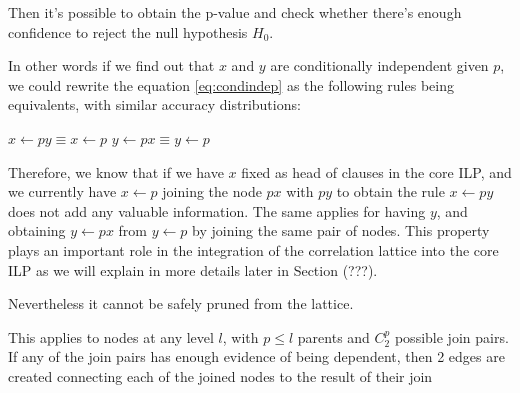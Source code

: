 Then it's possible to obtain the p-value and check whether there's enough confidence to reject the null hypothesis
$H_0$. 


In other words if we find out that $x$ and $y$ are conditionally independent given $p$, we could rewrite the equation
\ref{eq:condindep} as the following rules being equivalents, with similar accuracy distributions:

\begin{center}
  $x \leftarrow py \equiv x \leftarrow p $ \newline 
  $y \leftarrow px \equiv y \leftarrow p $
\end{center}

Therefore, we know that if we have $x$ fixed as head of clauses in the core ILP, and we currently have $x \leftarrow p$
joining the node $px$ with $py$ to obtain the rule $x \leftarrow py$ does not add any valuable information. The same
applies
for having $y$, and obtaining $y \leftarrow px$ from $y \leftarrow p$ by joining the same pair of nodes. This property
plays an important role in the integration of the correlation lattice into the core ILP as we will explain in more
details later in Section (???).

Nevertheless it cannot be safely pruned from the lattice.  

\begin{comment}
In level 1 from \graphname, nodes can be directly pruned, on the other hand, for further levels, for a node to be
pruned by independence, all the possible joins resulting the node must be independent. In level 2, for example, in order
to prune the node $r a_1 b_1 c_1$, given that in level 1 the nodes $r a_1 b_1$, $r a_1 c_1$ and $r b_1 c_1$ were not
pruned. All the three possible join combinations should fail the independence test, i.e.:

\begin{equation}
\begin{split} 
  freq(r a_1 b_1 c_1) &\approx freq(r a_1)p (r b_1|r a_1) p(r c_1|r a_1) \\ 
  &\approx  freq(r b_1) p(r a_1|r b_1) p(r c_1|r b_1) \\ 
  &\approx  freq(r c_1) p(r a_1|r c_1) p(r b_1|r c_1)  
\end{split}
\end{equation}
\end{comment}

This applies to nodes at any level $l$, with $p \leq l$ parents and $C_{2}^{p}$ possible join pairs. If any of the join
pairs has enough evidence of being dependent, then 2 edges are created connecting each of the joined
nodes to the result of their join

